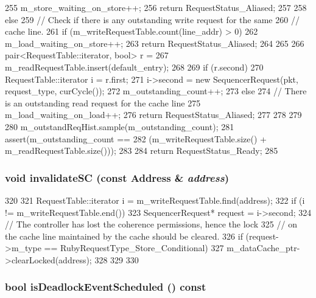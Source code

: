 \begin{DoxyCode}
{{{255           m_store_waiting_on_store++;
256           return RequestStatus_Aliased;
257         }
258     } else {
259         // Check if there is any outstanding write request for the same
260         // cache line.
261         if (m_writeRequestTable.count(line_addr) > 0) {
262             m_load_waiting_on_store++;
263             return RequestStatus_Aliased;
264         }
265 
266         pair<RequestTable::iterator, bool> r =
267             m_readRequestTable.insert(default_entry);
268 
269         if (r.second) {
270             RequestTable::iterator i = r.first;
271             i->second = new SequencerRequest(pkt, request_type, curCycle());
272             m_outstanding_count++;
273         } else {
274             // There is an outstanding read request for the cache line
275             m_load_waiting_on_load++;
276             return RequestStatus_Aliased;
277         }
278     }
279 
280     m_outstandReqHist.sample(m_outstanding_count);
281     assert(m_outstanding_count ==
282         (m_writeRequestTable.size() + m_readRequestTable.size()));
283 
284     return RequestStatus_Ready;
285 }
\end{DoxyCode}
\hypertarget{classSequencer_ab328ca1fdc98e525561d4fc99de4757c}{
\subsubsection[{invalidateSC}]{\setlength{\rightskip}{0pt plus 5cm}void invalidateSC (const {\bf Address} \& {\em address})}}
\label{classSequencer_ab328ca1fdc98e525561d4fc99de4757c}



\begin{DoxyCode}
320 {
321     RequestTable::iterator i = m_writeRequestTable.find(address);
322     if (i != m_writeRequestTable.end()) {
323         SequencerRequest* request = i->second;
324         // The controller has lost the coherence permissions, hence the lock
325         // on the cache line maintained by the cache should be cleared.
326         if (request->m_type == RubyRequestType_Store_Conditional) {
327             m_dataCache_ptr->clearLocked(address);
328         }
329     }
330 }
\end{DoxyCode}
\hypertarget{classSequencer_a11ce018fbd3aa89624b06dbdafbd4ef9}{
\subsubsection[{isDeadlockEventScheduled}]{\setlength{\rightskip}{0pt plus 5cm}bool isDeadlockEventScheduled () const}}
\label{classSequencer_a11ce018fbd3aa89624b06dbdafbd4ef9}



